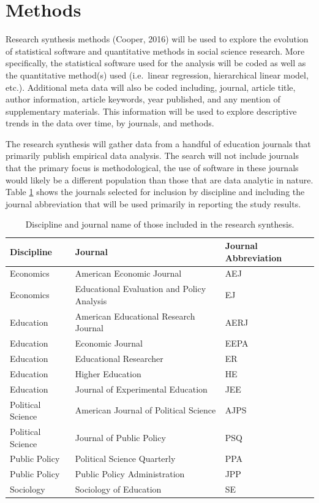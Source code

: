 \documentclass[
  english,
  ,man]{apa6}
\begin{document}
\hypertarget{methods}{%
\section{Methods}\label{methods}}

Research synthesis methods (Cooper, 2016) will be used to explore the evolution of statistical software and quantitative methods in social science research. More specifically, the statistical software used for the analysis will be coded as well as the quantitative method(s) used (i.e.~linear regression, hierarchical linear model, etc.). Additional meta data will also be coded including, journal, article title, author information, article keywords, year published, and any mention of supplementary materials. This information will be used to explore descriptive trends in the data over time, by journals, and methods.

The research synthesis will gather data from a handful of education journals that primarily publish empirical data analysis. The search will not include journals that the primary focus is methodological, the use of software in these journals would likely be a different population than those that are data analytic in nature. Table \ref{tab:journals} shows the journals selected for inclusion by discipline and including the journal abbreviation that will be used primarily in reporting the study results.

\begin{table}[!h]

\caption{\label{tab:journals}Discipline and journal name of those included in the research synthesis.}
\centering
\begin{tabular}[t]{lll}
\toprule
Discipline & Journal & Journal Abbreviation\\
\midrule
Economics & American Economic Journal & AEJ\\
Economics & Educational Evaluation and Policy Analysis & EJ\\
Education & American Educational Research Journal & AERJ\\
Education & Economic Journal & EEPA\\
Education & Educational Researcher & ER\\
\addlinespace
Education & Higher Education & HE\\
Education & Journal of Experimental Education & JEE\\
Political Science & American Journal of Political Science & AJPS\\
Political Science & Journal of Public Policy & PSQ\\
Public Policy & Political Science Quarterly & PPA\\
\addlinespace
Public Policy & Public Policy Administration & JPP\\
Sociology & Sociology of Education & SE\\
\bottomrule
\end{tabular}
\end{table}
\end{document}
